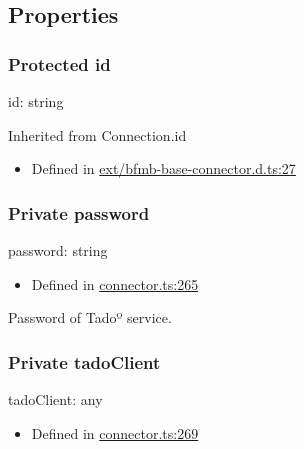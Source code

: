 \documentclass[]{article}
\providecommand{\tightlist}{%
  \setlength{\itemsep}{0pt}\setlength{\parskip}{0pt}}
\begin{document}
\hypertarget{properties-1}{%
\subsection{Properties}\label{properties-1}}

\protect\hypertarget{id}{}{}

\hypertarget{protected-id}{%
\subsubsection{\texorpdfstring{{Protected}
id}{Protected id}}\label{protected-id}}

id{:} {string}

Inherited from Connection.id

\begin{itemize}
\tightlist
\item
  Defined in
  \href{https://github.com/BFMBFramework/TadoConnector/blob/f05932b/src/ext/bfmb-base-connector.d.ts\#L27}{ext/bfmb-base-connector.d.ts:27}
\end{itemize}

\protect\hypertarget{password}{}{}

\hypertarget{private-password}{%
\subsubsection{\texorpdfstring{{Private}
password}{Private password}}\label{private-password}}

password{:} {string}

\begin{itemize}
\tightlist
\item
  Defined in
  \href{https://github.com/BFMBFramework/TadoConnector/blob/f05932b/src/connector.ts\#L265}{connector.ts:265}
\end{itemize}

Password of Tadoº service.

\protect\hypertarget{tadoclient}{}{}

\hypertarget{private-tadoclient}{%
\subsubsection{\texorpdfstring{{Private}
tadoClient}{Private tadoClient}}\label{private-tadoclient}}

tadoClient{:} {any}

\begin{itemize}
\tightlist
\item
  Defined in
  \href{https://github.com/BFMBFramework/TadoConnector/blob/f05932b/src/connector.ts\#L269}{connector.ts:269}
\end{itemize}
\end{document}
